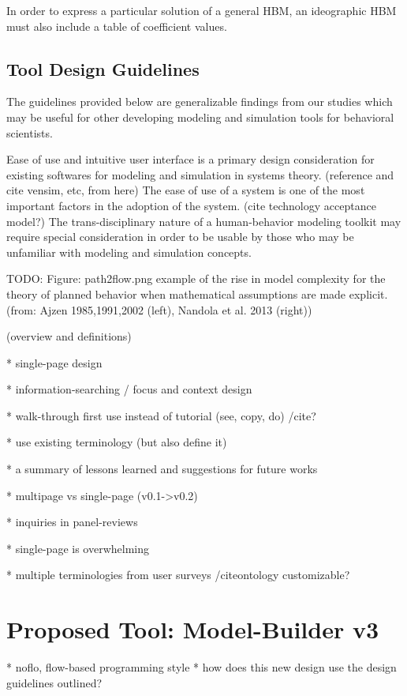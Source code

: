 \documentclass[conference]{IEEEtran}
\begin{document}
In order to express a particular solution of a general HBM, an ideographic HBM must also include a table of coefficient values. 

\subsection{Tool Design Guidelines}
The guidelines provided below are generalizable findings from our studies which may be useful for other developing modeling and simulation tools for behavioral scientists.


Ease of use and intuitive user interface is a primary design consideration for existing softwares for modeling and simulation in systems theory. (reference and cite vensim, etc, from here) 
The ease of use of a system is one of the most important factors in the adoption of the system. (cite technology acceptance model?) 
The trans-disciplinary nature of a human-behavior modeling toolkit may require special consideration in order to be usable by those who may be unfamiliar with modeling and simulation concepts.

TODO: Figure: path2flow.png example of the rise in model complexity for the theory of planned behavior when mathematical assumptions are made explicit. (from: Ajzen 1985,1991,2002 (left), Nandola et al. 2013 (right))

(overview and definitions)

* single-page design

* information-searching / focus and context design

* walk-through first use instead of tutorial (see, copy, do) /cite{?}

* use existing terminology (but also define it)

* a summary of lessons learned and suggestions for future works

* multipage vs single-page (v0.1->v0.2)

* inquiries in panel-reviews

* single-page is overwhelming 

* multiple terminologies from user surveys /cite{ontology} customizable? 





\section{Proposed Tool: Model-Builder v3}
* noflo, flow-based programming style
* how does this new design use the design guidelines outlined?
\end{document}
